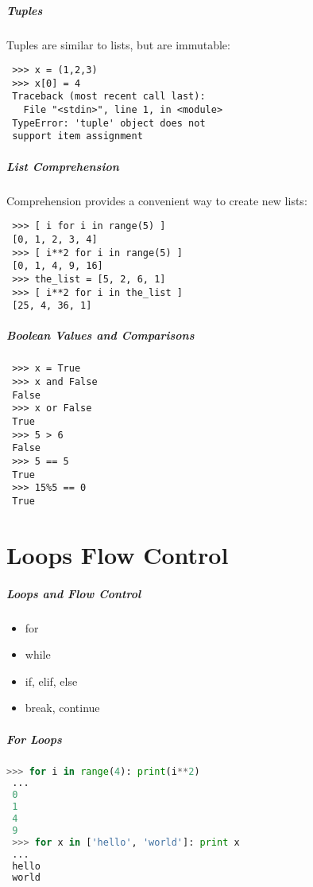 \documentclass[hyperref={colorlinks, linkcolor=blue, urlcolor=blue}]{beamer}
\begin{document}
\begin{frame}[fragile]
  \frametitle{Tuples}
  Tuples are similar to lists, but are immutable:
    \begin{lstlisting}
 >>> x = (1,2,3)
 >>> x[0] = 4
 Traceback (most recent call last):
   File "<stdin>", line 1, in <module>
 TypeError: 'tuple' object does not 
 support item assignment
   \end{lstlisting}
\end{frame}

  \begin{frame}[fragile]
    \frametitle{List Comprehension}

    Comprehension provides a convenient way to create new lists:
  \begin{lstlisting}
 >>> [ i for i in range(5) ]
 [0, 1, 2, 3, 4]
 >>> [ i**2 for i in range(5) ]
 [0, 1, 4, 9, 16]
 >>> the_list = [5, 2, 6, 1]
 >>> [ i**2 for i in the_list ]
 [25, 4, 36, 1]
  \end{lstlisting}
\end{frame}

\begin{frame}[fragile]
  \frametitle{Boolean Values and Comparisons}

  \begin{lstlisting}
 >>> x = True 
 >>> x and False 
 False
 >>> x or False
 True
 >>> 5 > 6
 False
 >>> 5 == 5
 True
 >>> 15%5 == 0
 True
  \end{lstlisting}
\end{frame}

\part{Loops Flow Control} 

\begin{frame}
  \frametitle{Loops and Flow Control}  
  \begin{itemize}
  \item for
  \item while
  \item if, elif, else
  \item break, continue
  \end{itemize}
\end{frame}

\begin{frame}[fragile]
  \frametitle{For Loops}
  \begin{lstlisting}[language=Python]
 >>> for i in range(4): print(i**2)
 ... 
 0
 1
 4
 9
 >>> for x in ['hello', 'world']: print x
 ...
 hello
 world
  \end{lstlisting}
\end{frame}
\end{document}
